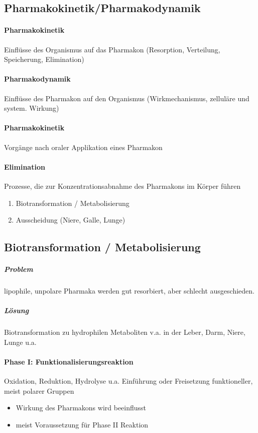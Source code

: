 \documentclass[10pt,a4paper]{report}
\begin{document}
\subsection{Pharmakokinetik/Pharmakodynamik}
\paragraph{Pharmakokinetik} 	Einflüsse des Organismus auf das Pharmakon (Resorption, Verteilung, Speicherung, Elimination)
\paragraph{Pharmakodynamik} Einflüsse des Pharmakon auf den Organismus (Wirkmechanismus, zelluläre und system. Wirkung)
\paragraph{Pharmakokinetik}  Vorgänge nach oraler Applikation eines Pharmakon
\paragraph{Elimination} Prozesse, die zur Konzentrationsabnahme des Pharmakons im Körper führen
\begin{enumerate}
	\item Biotransformation / Metabolisierung
	\item Ausscheidung (Niere, Galle, Lunge)
\end{enumerate}
\subsection{Biotransformation / Metabolisierung}
\subparagraph{Problem} lipophile, unpolare Pharmaka werden gut resorbiert, aber schlecht 	ausgeschieden. 
\subparagraph{Lösung} Biotransformation zu hydrophilen Metaboliten v.a. in der Leber, Darm, Niere, Lunge u.a.

\paragraph{Phase I: 	Funktionalisierungsreaktion}
Oxidation, Reduktion, Hydrolyse u.a. 
Einführung oder Freisetzung funktioneller, meist polarer Gruppen 

\begin{itemize}
\item Wirkung des Pharmakons wird beeinflusst
\item meist Voraussetzung für Phase II Reaktion
\end{itemize}
\end{document}
